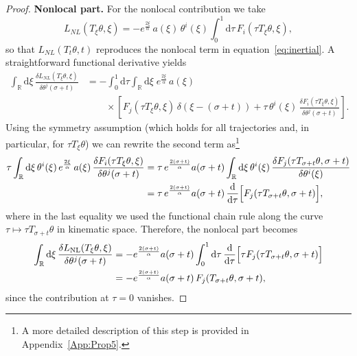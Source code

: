 \documentclass{article} %
\def\eqref#1{equation~\ref{#1}}
\begin{document}
\begin{proof}
\noindent\textbf{Nonlocal part.}
For the nonlocal contribution we take
\[
L_{NL}(T_\xi \theta, \xi)
=- e^{\frac{2\xi}{\alpha}}\,
a(\xi)\,\theta^i(\xi)
\int^1_0 \mathrm{d}\tau\,F_i(\tau T_{\xi}\theta,\xi),
\]
so that $L_{NL}(T_t\theta,t)$ reproduces the nonlocal term in \eqref{eq:inertial}. A straightforward functional derivative yields
\begin{equation*}
\begin{split}
\int_\mathbb{R}\mathrm{d}\xi\,
\frac{\delta L_{NL}(T_\xi \theta, \xi)}{\delta \theta^j(\sigma+t)}
&=
-\int^1_0\mathrm{d}\tau\int_\mathbb{R}\mathrm{d}\xi\;
e^{\frac{2\xi}{\alpha}}\,a(\xi)
\\ &\qquad\times
\left[
F_j(\tau T_\xi\theta,\xi)\,\delta(\xi-(\sigma+t))
+
\tau\,\theta^i(\xi)\,
\frac{\delta F_i(\tau T_\xi\theta,\xi)}{\delta\theta^j(\sigma+t)}
\right].
\end{split}
\end{equation*}
Using the symmetry assumption (which holds for all trajectories and, in particular, for $\tau T_\xi\theta$) we can rewrite the
second term as\footnote{A more detailed description of this step is provided in Appendix~\ref{App:Prop5}.}
\begin{align*}
 \tau \int_{\mathbb{R}} \mathrm{d}\xi \,
 \theta^i(\xi)\,e^{\frac{2\xi}{\alpha}}\,a(\xi)\,
 \frac{\delta F_i(\tau T_\xi\theta, \xi)}{\delta \theta^j(\sigma + t)}
 &=
 \tau\,e^{\frac{2(\sigma + t)}{\alpha}} a(\sigma + t)
 \int_{\mathbb{R}} \mathrm{d}\xi \,
 \theta^i(\xi)\,
 \frac{\delta F_j(\tau T_{\sigma + t} \theta,\sigma+t)}{\delta \theta^i(\xi)} \\
 &= \tau\,e^{\frac{2(\sigma + t)}{\alpha}} a(\sigma + t)\,
 \frac{\mathrm{d}}{\mathrm{d}\tau}
 \Bigl[F_j(\tau T_{\sigma + t}\theta, \sigma + t)\Bigr],
\end{align*}
where in the last equality we used the functional chain rule along the curve
$\tau\mapsto \tau T_{\sigma+t}\theta$ in kinematic space. Therefore, the nonlocal part becomes
\begin{align*}
    \int_{\mathbb{R}} \mathrm{d}\xi\,
    \frac{\delta L_{\text{NL}}(T_\xi \theta, \xi)}{\delta \theta^j(\sigma + t)}
    &=
    -e^{\frac{2(\sigma + t)}{\alpha}} a(\sigma + t)
    \int_0^1 \mathrm{d}\tau\,
    \frac{\mathrm{d}}{\mathrm{d}\tau}\Bigl[\tau F_j(\tau T_{\sigma + t} \theta, \sigma + t)\Bigr] \\
    &=
    -e^{\frac{2(\sigma + t)}{\alpha}} a(\sigma + t)\,
    F_j(T_{\sigma + t} \theta, \sigma + t),
\end{align*}
since the contribution at $\tau=0$ vanishes.


\end{proof}
\end{document}
